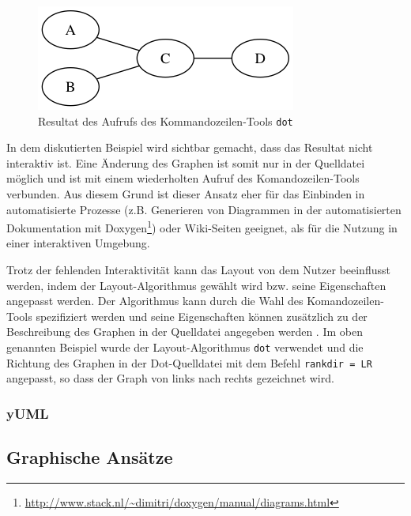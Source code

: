 \begin{figure}[hbt]
    \centering
    \includegraphics[scale=0.75]{resources/graphviz-dot-example.png}
    \caption{Resultat des Aufrufs des Kommandozeilen-Tools \lstinline{dot}}
    \label{fig:graphviz-dot-example}
\end{figure}

In dem diskutierten Beispiel wird sichtbar gemacht, dass das Resultat nicht interaktiv ist. Eine Änderung des Graphen ist somit nur in der Quelldatei möglich und ist mit einem wiederholten Aufruf des Komandozeilen-Tools verbunden. Aus diesem Grund ist dieser Ansatz eher für das Einbinden in automatisierte Prozesse (z.B. Generieren von Diagrammen in der automatisierten Dokumentation mit Doxygen\footnote{\url{http://www.stack.nl/~dimitri/doxygen/manual/diagrams.html}}) oder Wiki-Seiten geeignet, als für die Nutzung in einer interaktiven Umgebung.

Trotz der fehlenden Interaktivität kann das Layout von dem Nutzer beeinflusst werden, indem der Layout-Algorithmus gewählt wird bzw. seine Eigenschaften angepasst werden. Der Algorithmus kann durch die Wahl des Komandozeilen-Tools spezifiziert werden und seine Eigenschaften können zusätzlich zu der Beschreibung des Graphen in der Quelldatei angegeben werden \cite{NorthGansner14Dot-Manual}. Im oben genannten Beispiel wurde der Layout-Algorithmus \lstinline{dot} verwendet und die Richtung des Graphen in der Dot-Quelldatei mit dem Befehl \lstinline{rankdir = LR} angepasst, so dass der Graph von links nach rechts gezeichnet wird.

\subsubsection{yUML}


\subsection{Graphische Ansätze}
\label{subsec:automatic-layout-graphical-approaches}

